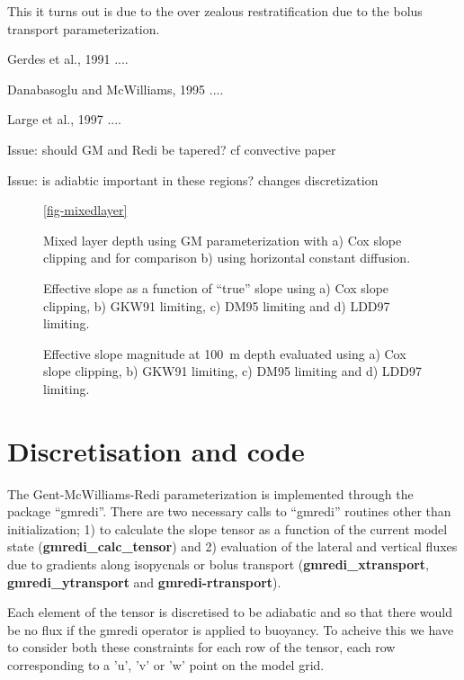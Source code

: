 \documentclass[12pt]{article}
\begin{document}
This it turns out is due to the over zealous restratification due to
the bolus transport parameterization.

Gerdes et al., 1991 ....

Danabasoglu and McWilliams, 1995 ....

Large et al., 1997 ....

Issue: should GM and Redi be tapered? cf convective paper

Issue: is adiabtic important in these regions? changes discretization



\begin{figure}


\caption{Mixed layer depth using GM parameterization with a) Cox slope
clipping and for comparison b) using horizontal constant diffusion.}
\ref{fig-mixedlayer}
\end{figure}

\begin{figure}

\caption{Effective slope as a function of ``true'' slope using a) Cox
slope clipping, b) GKW91 limiting, c) DM95 limiting and d) LDD97
limiting.}
\end{figure}


\begin{figure}
\caption{Effective slope magnitude at 100~m depth evaluated using a)
Cox slope clipping, b) GKW91 limiting, c) DM95 limiting and d) LDD97
limiting.}
\end{figure}

\section{Discretisation and code}

The Gent-McWilliams-Redi parameterization is implemented through the
package ``gmredi''. There are two necessary calls to ``gmredi''
routines other than initialization; 1) to calculate the slope tensor
as a function of the current model state ({\bf gmredi\_calc\_tensor})
and 2) evaluation of the lateral and vertical fluxes due to gradients
along isopycnals or bolus transport ({\bf gmredi\_xtransport}, {\bf
gmredi\_ytransport} and {\bf gmredi-rtransport}).

Each element of the tensor is discretised to be adiabatic and so that
there would be no flux if the gmredi operator is applied to buoyancy.
To acheive this we have to consider both these constraints for each
row of the tensor, each row corresponding to a 'u', 'v' or 'w' point
on the model grid. 
\end{document}
